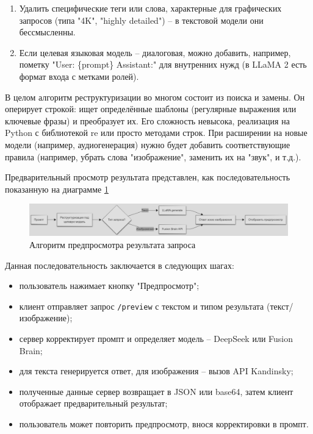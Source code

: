 \begin{enumerate}[label=\arabic*]
\begin{enumerate}[label=2.\arabic*]
        \item Удалить специфические теги или слова, характерные для графических запросов (типа "4K", "highly detailed") – в текстовой модели они бессмысленны.
        \item Если целевая языковая модель – диалоговая, можно добавить, например, пометку "User: \{prompt\} Assistant:" для внутренних нужд (в LLaMA 2 есть формат входа с метками ролей).
    \end{enumerate}
\end{enumerate}
В целом алгоритм реструктуризации во многом состоит из поиска и замены. Он оперирует строкой: ищет определённые шаблоны (регулярные выражения или ключевые фразы) и преобразует их. Его сложность невысока, реализация на Python с библиотекой re или просто методами строк. При расширении на новые модели (например, аудиогенерация) нужно будет добавить соответствующие правила (например, убрать слова "изображение", заменить их на "звук", и т.д.).

Предварительный просмотр результата представлен, как последовательность показанную на диаграмме \ref{algo-3}
\begin{figure}[htbp]
    \centering
    \includegraphics[width=1\textwidth]{picture/diploma-inter-algo-3.png}
    \caption{Алгоритм предпросмотра результата запроса}
    \label{algo-3}
\end{figure}


Данная последовательность заключается в следующих шагах:
\begin{itemize}
    \item пользователь нажимает кнопку "Предпросмотр";
    \item клиент отправляет запрос \texttt{/preview} с текстом и типом результата (текст/изображение);
    \item сервер корректирует промпт и определяет модель – DeepSeek или Fusion Brain;
    \item для текста генерируется ответ, для изображения – вызов API Kandinsky;
    \item полученные данные сервер возвращает в JSON или base64, затем клиент отображает предварительный результат;
    \item пользователь может повторить предпросмотр, внося корректировки в промпт.
\end{itemize}

